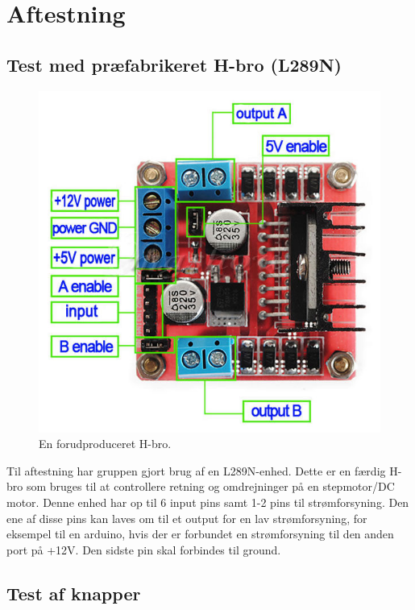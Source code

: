 \section{Aftestning}

\subsection{Test med præfabrikeret H-bro (L289N)}

\begin{figure}[H]
\centering
\includegraphics[scale=0.4]{Billeder/H-bro.jpg}
\caption{ En forudproduceret H-bro.}
\label{fig:mikrocontrollerprint}
\end{figure}

Til aftestning har gruppen gjort brug af en L289N-enhed. Dette er en færdig H-bro som bruges til at controllere retning og omdrejninger på en stepmotor/DC motor. Denne enhed har op til 6 input pins samt 1-2 pins til strømforsyning. Den ene af disse pins kan laves om til et output for en lav strømforsyning, for eksempel til en arduino, hvis der er forbundet en strømforsyning til den anden port på +12V. Den sidste pin skal forbindes til ground.

\subsection{Test af knapper}


